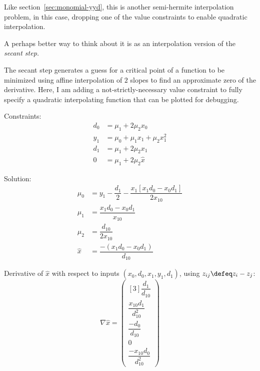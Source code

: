 \label{sec:monomial-dyd}

Like section~\ref{sec:monomial-yyd},
this is another semi-hermite interpolation problem,
in this case, dropping one of the value constraints to enable 
quadratic interpolation.

A perhaps better way to think about it is as an interpolation
version of the \textit{secant step.}

The secant step generates a guess for a critical point
of a function to be minimized using affine interpolation
of $2$ slopes to find an approximate zero of the derivative.
Here, I am adding a not-strictly-necessary value constraint 
to fully specify a quadratic interpolating function that can be 
plotted for debugging.

Constraints:
\begin{align}
d_0 & = \mu_1 + 2 \mu_2 x_0
\\
y_1 & = \mu_0 + \mu_1 x_1 + \mu_2 x_1^2
\nonumber
\\
d_1 & = \mu_1 + 2 \mu_2 x_1
\nonumber
\\
0 & = \mu_1 + 2 \mu_2 \hat{x}
\nonumber
\end{align}

Solution:
\begin{align}
\mu_0 & = 
y_1 
- 
\dfrac{d_1}{2}
-
\dfrac{x_1 \left[x_1 d_0 - x_0 d_1 \right]}{2 x_{10}}
\\
\mu_1 & =
\dfrac{x_1 d_0 - x_0 d_1}{x_{10}}
\nonumber
\\
\mu_2 & = \dfrac{d_{10}}{2 x_{10}}
\nonumber
\\
\hat{x} & = \dfrac{- \left( x_1 d_0 - x_0 d_1 \right)}{d_{10}}
\nonumber
\end{align}

Derivative of $\hat{x}$ with respect to inputs
$(x_0,d_0,x_1,y_1,d_1)$,
using $z_{ij} \defeq z_i - z_j$:
\begin{equation}
\nabla \hat{x} =
\begin{pmatrix}[3]
\dfrac{d_1}{d_{10}}
\\
\dfrac{ x_{10} d_1}{d_{10}^{2}}
\\
\dfrac{- d_0}{d_{10}}
\\
0
\\
\dfrac{- x_{10} d_0}{d_{10}^{2}
}
\end{pmatrix}
\end{equation}
 
